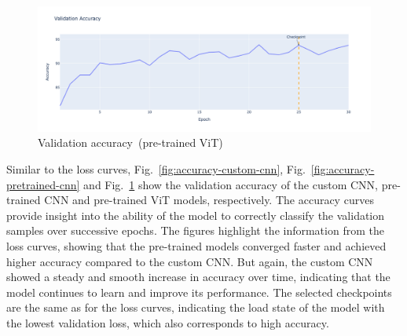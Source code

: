\begin{figure}[htbp]
    \centerline{\includegraphics[width=0.9\linewidth]{../../resources/vit/accuracy.png}}
    \caption{Validation accuracy~(pre-trained ViT)}
    \label{fig:accuracy-pretrained-vit}
\end{figure}

Similar to the loss curves, Fig.~\ref{fig:accuracy-custom-cnn}, Fig.~\ref{fig:accuracy-pretrained-cnn} and Fig.~\ref{fig:accuracy-pretrained-vit} show the validation accuracy of the custom CNN, pre-trained CNN and pre-trained ViT models, respectively. The accuracy curves provide insight into the ability of the model to correctly classify the validation samples over successive epochs. The figures highlight the information from the loss curves, showing that the pre-trained models converged faster and achieved higher accuracy compared to the custom CNN. But again, the custom CNN showed a steady and smooth increase in accuracy over time, indicating that the model continues to learn and improve its performance. The selected checkpoints are the same as for the loss curves, indicating the load state of the model with the lowest validation loss, which also corresponds to high accuracy.